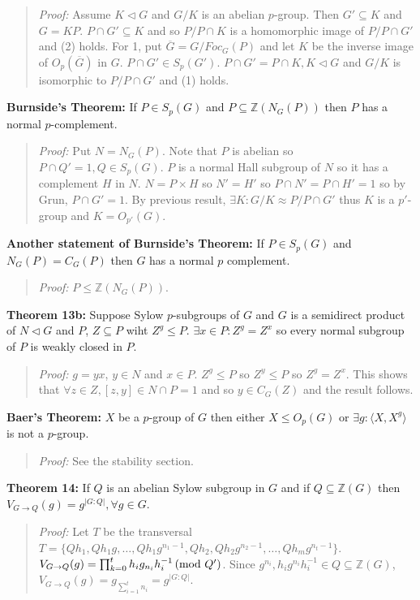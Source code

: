 \begin{quote}
\emph{Proof:}  Assume $K \lhd G$ and $G/K$ is an abelian $p$-group.  Then $G' \subseteq K$ and
$G= KP$.  $P \cap G' \subseteq K$ and so $P/P \cap K$ is a homomorphic image of $P/P \cap G'$ and (2)
holds.  For 1, put ${\overline G} = G/Foc_G(P)$ and let
$K$ be the inverse image of $O_{p}({\overline G})$
in $G$.  $P \cap G' \in S_p(G')$.  
$P \cap G' = P \cap K, K \lhd G$ and $G/K$ is isomorphic to $P/P \cap G'$ and (1) holds.
\end{quote}
{\bf Burnside's Theorem:} 
If $P \in S_p(G)$ and $P \subseteq {\mathbb Z}(N_G(P))$ then $P$ has a normal
$p$-complement.
\begin{quote}
\emph{Proof:}  Put $N=N_G(P)$.  Note that $P$ is abelian so $P \cap Q'= 1, Q \in S_p(G)$.
$P$ is a normal Hall subgroup of $N$ so it has a complement $H$ in $N$.  $N= P \times H$ so
$N' = H'$ so $P \cap N' = P \cap H' = 1$ so by Grun, $P \cap G'=1$.  By previous result, $\exists K:
G/K \approx P/P \cap G'$ thus $K$ is a $p'$-group and $K= O_{p'}(G)$.
\end{quote}
{\bf Another statement of Burnside's Theorem:} 
If $P \in S_p(G)$ and $N_G(P) = C_G(P)$ then $G$ has a normal $p$ complement.
\begin{quote}
\emph{Proof:} 
$P \leq {\mathbb Z}(N_G(P))$.
\end{quote}
{\bf Theorem 13b:} Suppose Sylow $p$-subgroups of $G$ and $G$ is a semidirect product of $N \lhd G$ and $P$,
$Z \subseteq P$ wiht $Z^g \leq P$. $\exists x \in P: Z^g = Z^x$ so every normal subgroup of $P$ is weakly
closed in $P$.
\begin{quote}
\emph{Proof:} 
$g=yx$, $y \in N$ and $x \in P$.
$Z^g \leq P$ so $Z^y \leq P$ so $Z^g = Z^x$.
This shows that $\forall z \in Z, [z,y] \in N \cap P = 1$ and so
$y \in C_G(Z)$ and the result follows.
\end{quote}
{\bf Baer's Theorem:}
$X$ be a $p$-group of $G$ then either
$X \le O_p(G)$ or $\exists g: \langle X, X^g \rangle $ is not a $p$-group.
\begin{quote}
\emph{Proof:}  
See the stability section.
\end{quote}
{\bf Theorem 14:} If $Q$ is an abelian Sylow subgroup in $G$ and if $Q \subseteq {\mathbb Z}(G)$ then
$V_{G \rightarrow Q}(g)= g^{|G:Q|}, \forall g \in G$.  
\begin{quote}
\emph{Proof:}  
Let $T$ be the transversal 
$T= \{ Qh_1, Qh_1g, \ldots , Qh_1g^{n_1-1}, Qh_2, Qh_2 g^{n_2-1}, \ldots, Qh_m g^{n_t-1} \}$. 
$V_{G \rightarrow Q}(g)= \prod_{k=0}^t h_i g_{n_i} h_i^{-1} \thinspace \textnormal{(mod } Q' \textnormal{)}$.  Since 
$g^{n_i}, h_i g^{n_i} h_i^{-1} \in Q \subseteq {\mathbb Z}(G)$, 
$V_{G \rightarrow Q}(g)= g_{\sum_{i=1}^t n_i} = g^{|G:Q|}$. 
\end{quote}

